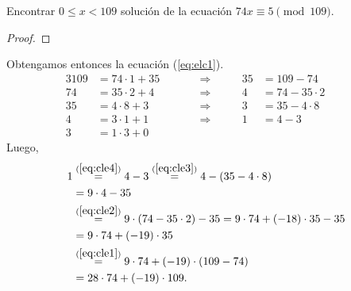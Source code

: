 \documentclass[handout]{beamer} %
\begin{document}
	
	\begin{frame}
		\begin{ejemplo} Encontrar $0 \le x < 109$ solución  de la ecuación $74x\equiv 5 \pmod{109}$.
		\end{ejemplo}\pause
		\begin{proof} \pause
			
			
			
		\end{proof}
	\end{frame}
	
	
	\begin{frame}
		Obtengamos entonces la ecuación (\ref{eq:elc1}).\pause
		\begin{alignat}3
			109 &= 74 \cdot 1 + 35& \qquad&\Rightarrow& \qquad 35 &= 109 - 74 \label{eq:cle1}\\ 
			74 &=  35\cdot 2 +4 & \qquad&\Rightarrow& \qquad 4 &= 74 - 35\cdot 2 \label{eq:cle2}\qquad\\
			35 &= 4 \cdot 8 + 3& \qquad&\Rightarrow& \qquad  3 &= 35 - 4 \cdot 8 \label{eq:cle3}  \\
			4 &=  3\cdot 1 + 1& \qquad&\Rightarrow& \qquad 1 &= 4 - 3\label{eq:cle4}\\
			3 &=  1\cdot 3  +0 & \qquad&& \qquad  &
		\end{alignat}
		\pause	Luego,\pause
		\begin{align*}
			1 & \overset{(\ref{eq:cle4})}{=} 4 -3 \overset{(\ref{eq:cle3})}{=} 4 - ( 35 - 4 \cdot 8) \\
			&=  9 \cdot 4 - 35 \\
			& \overset{(\ref{eq:cle2})}{=} 9 \cdot (74 - 35\cdot 2) - 35  = 9 \cdot  74 + (-18) \cdot 35 - 35 \\
			&= 9 \cdot  74 + (-19) \cdot 35 \\
			& \overset{(\ref{eq:cle1})}{=}  9 \cdot  74 + (-19) \cdot (109 - 74) \\ %
			&= 28 \cdot  74 + (-19) \cdot 109 .
		\end{align*}
	\end{frame}
	
\end{document}

